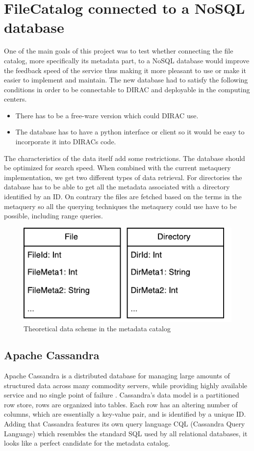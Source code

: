 \chapter{FileCatalog connected to a NoSQL database}
\label{chap:databases}
One of the main goals of this project was to test whether connecting the 
file catalog, more specifically its metadata part, to a NoSQL database would 
improve the feedback speed of the service thus making it more pleasant to use
or make it easier to implement and maintain. The new database had to satisfy the
following conditions in order to be connectable to DIRAC and deployable in
the computing centers.

\begin{itemize}
\item There has to be a free-ware version which could DIRAC use.
\item The database has to have a python interface or client so it would be easy
to incorporate it into DIRACs code.
\end{itemize}

The characteristics of the data itself add some restrictions. The database should be
optimized for search speed. When combined with the current metaquery implementation, we
get two different types of data retrieval. For directories 
the database has to be able to get all the metadata associated with a directory
identified by an ID. On contrary the files are fetched based on the terms in the metaquery so
all the querying techniques the metaquery could use have to be possible, including
range queries. 

\begin{figure}[h]
\centering
\includegraphics[scale=0.9]{img/dataTyp.pdf}
\caption{Theoretical data scheme in the metadata catalog}
\label{fig:theoDataScheme}
\end{figure}


\section{Apache Cassandra}
Apache Cassandra is a distributed database for managing large amounts of structured data 
across many commodity servers, while providing highly available service and no single point 
of failure \cite{cassandra}. Cassandra's data model is a
partitioned row store, rows are organized into tables. Each row
has an altering number of columns, which are essentially a
key-value pair, and is identified by a unique ID. Adding that Cassandra features
its own query language CQL (Cassandra Query Language) which resembles the standard SQL 
used by all relational databases, it looks like a perfect candidate for the metadata catalog.

